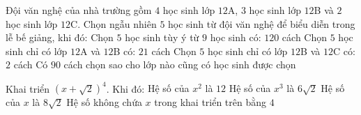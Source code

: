 \begin{ex}%
	Đội văn nghệ của nhà trường gồm $4$ học sinh lớp $12$A, $3$ học sinh lớp $12$B và $2$ học sinh lớp $12$C. Chọn ngẫu nhiên $5$ học sinh từ đội văn nghệ để biểu diễn trong lễ bế giảng, khi đó:
	\choiceTF
	{ Chọn $5$ học sinh tùy ý từ $9$ học sinh có: $120$ cách}
	{\True Chọn $5$ học sinh chỉ có lớp $12$A và $12$B có: $21$ cách}
	{ Chọn $5$ học sinh chỉ có lớp $12$B và $12$C có: $2$ cách}
	{Có $90$ cách chọn sao cho lớp nào cũng có học sinh được chọn} 
\end{ex}

\begin{ex}%
	Khai triển $(x+\sqrt{2})^4$. Khi đó:
	\choiceTF
	{\True Hệ số của $x^2$ là $12$}
	{ Hệ số của $x^3$ là $6 \sqrt{2}$}
	{\True Hệ số của $x$ là $8 \sqrt{2}$}
	{\True Hệ số không chứa $x$ trong khai triển trên bằng $4$} 
\end{ex}

